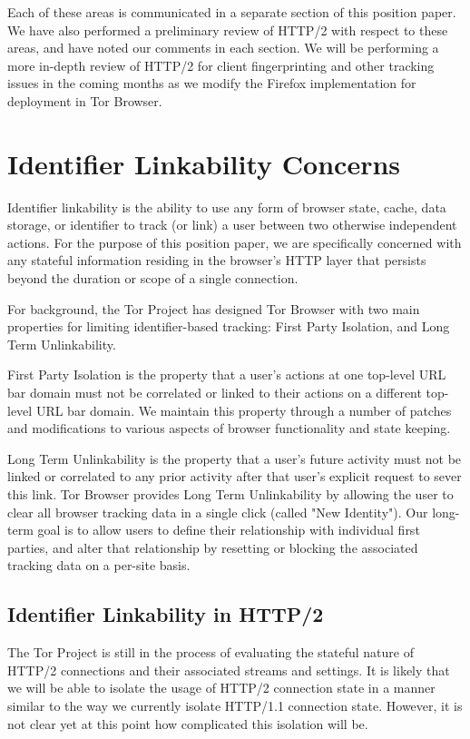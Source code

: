 \documentclass[letterpaper,11pt]{llncs}
\begin{document}
Each of these areas is communicated in a separate section of this position
paper. We have also performed a preliminary review of HTTP/2 with respect to
these areas, and have noted our comments in each section. We will be
performing a more in-depth review of HTTP/2 for client fingerprinting and
other tracking issues in the coming months as we modify the Firefox
implementation for deployment in Tor Browser.

\section{Identifier Linkability Concerns}

Identifier linkability is the ability to use any form of browser state, cache,
data storage, or identifier to track (or link) a user between two otherwise
independent actions. For the purpose of this position paper, we are
specifically concerned with any stateful information residing in the browser's
HTTP layer that persists beyond the duration or scope of a single connection.

For background, the Tor Project has designed Tor Browser with two main
properties for limiting identifier-based tracking: First Party Isolation, and
Long Term Unlinkability.

First Party Isolation is the property that a user's actions at one
top-level URL bar domain must not be correlated or linked to their actions on a
different top-level URL bar domain. We maintain this property through a number
of patches and modifications to various aspects of browser functionality and
state keeping.

Long Term Unlinkability is the property that a user's future activity must not
be linked or correlated to any prior activity after that user's explicit request
to sever this link. Tor Browser provides Long Term Unlinkability by allowing
the user to clear all browser tracking data in a single click (called "New
Identity"). Our long-term goal is to allow users to define their relationship
with individual first parties, and alter that relationship by resetting or
blocking the associated tracking data on a per-site basis.

\subsection{Identifier Linkability in HTTP/2}

The Tor Project is still in the process of evaluating the stateful nature of
HTTP/2 connections and their associated streams and settings. It is likely
that we will be able to isolate the usage of HTTP/2 connection state in a
manner similar to the way we currently isolate HTTP/1.1 connection state.
However, it is not clear yet at this point how complicated this isolation will
be.
\end{document}
